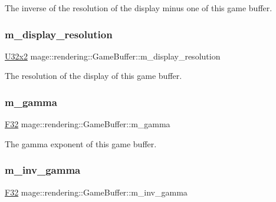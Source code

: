 The inverse of the resolution of the display minus one of this game buffer. \hypertarget{structmage_1_1rendering_1_1_game_buffer_a0d1ae294ea443c48c348af75442a8f54}{}\label{structmage_1_1rendering_1_1_game_buffer_a0d1ae294ea443c48c348af75442a8f54} 
\subsubsection{\texorpdfstring{m\+\_\+display\+\_\+resolution}{m\_display\_resolution}}
{\footnotesize\ttfamily \hyperlink{namespacemage_a88e05bff0300120c013285d3dcad95c5}{U32x2} mage\+::rendering\+::\+Game\+Buffer\+::m\+\_\+display\+\_\+resolution}

The resolution of the display of this game buffer. \hypertarget{structmage_1_1rendering_1_1_game_buffer_af95208ebc18bf3c124fef8e8810343db}{}\label{structmage_1_1rendering_1_1_game_buffer_af95208ebc18bf3c124fef8e8810343db} 
\subsubsection{\texorpdfstring{m\+\_\+gamma}{m\_gamma}}
{\footnotesize\ttfamily \hyperlink{namespacemage_aa97e833b45f06d60a0a9c4fc22ae02c0}{F32} mage\+::rendering\+::\+Game\+Buffer\+::m\+\_\+gamma}

The gamma exponent of this game buffer. \hypertarget{structmage_1_1rendering_1_1_game_buffer_aa1b45ad86f1eae57e4ba1dbc1732994b}{}\label{structmage_1_1rendering_1_1_game_buffer_aa1b45ad86f1eae57e4ba1dbc1732994b} 
\subsubsection{\texorpdfstring{m\+\_\+inv\+\_\+gamma}{m\_inv\_gamma}}
{\footnotesize\ttfamily \hyperlink{namespacemage_aa97e833b45f06d60a0a9c4fc22ae02c0}{F32} mage\+::rendering\+::\+Game\+Buffer\+::m\+\_\+inv\+\_\+gamma}

